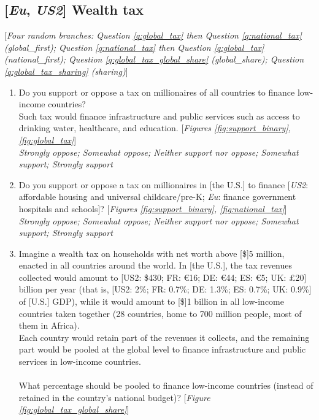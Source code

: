 \subsection*{[\textit{Eu}, \textit{US2}] Wealth tax}
[\textit{Four random branches: Question \ref{q:global_tax} then Question \ref{q:national_tax} (global\_first); Question \ref{q:national_tax} then Question \ref{q:global_tax} (national\_first); Question \ref{q:global_tax_global_share} (global\_share); Question \ref{q:global_tax_sharing} (sharing)}]
\begin{enumerate}[resume] 
    \item \label{q:global_tax} Do you support or oppose a tax on millionaires of all countries to finance low-income countries? \\
    Such tax would finance infrastructure and public services such as access to drinking water, healthcare, and education. [\textit{Figures \ref{fig:support_binary}, \ref{fig:global_tax}}]
   \\ \textit{Strongly oppose; Somewhat oppose; Neither support nor oppose; Somewhat support; Strongly support}
   \item \label{q:national_tax} Do you support or oppose a tax on millionaires in [the U.S.] to finance [\textit{US2}: affordable housing and universal childcare/pre-K; \textit{Eu}: finance government hospitals and schools]?  [\textit{Figures \ref{fig:support_binary},  \ref{fig:national_tax}}]
  \\ \textit{Strongly oppose; Somewhat oppose; Neither support nor oppose; Somewhat support; Strongly support}
  \item \label{q:global_tax_global_share} Imagine a wealth tax on households with net worth above [\$]5 million, enacted in all countries around the world.  
  In [the U.S.], the tax revenues collected would amount to [US2: \$430; FR: \euro{}16; DE: \euro{}44; ES: \euro{}5; UK: £20] billion per year (that is, [US2: 2\%; FR: 0.7\%; DE: 1.3\%; ES: 0.7\%; UK: 0.9\%] of [U.S.] GDP), while it would amount to [\$]1 billion in all low-income countries taken together (28 countries, home to 700 million people, most of them in Africa).  \\
  Each country would retain part of the revenues it collects, and the remaining part would be pooled at the global level to finance infrastructure and public services in low-income countries.  \\
     \\
  What percentage should be pooled to finance low-income countries (instead of retained in the country's national budget)?  [\textit{Figure \ref{fig:global_tax_global_share}}]

\end{enumerate}
